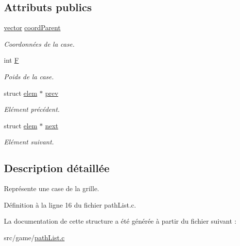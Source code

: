 \subsection*{Attributs publics}
\begin{DoxyCompactItemize}
\item 
\hypertarget{structelem_a5460522be783257def1ac511288d74cb}{}\hyperlink{structvector}{vector} \hyperlink{structelem_a5460522be783257def1ac511288d74cb}{coord\+Parent}\label{structelem_a5460522be783257def1ac511288d74cb}

\begin{DoxyCompactList}\small\item\em Coordonnées de la case. \end{DoxyCompactList}\item 
\hypertarget{structelem_a000b7b27f503652106d30642ce3f40c2}{}int \hyperlink{structelem_a000b7b27f503652106d30642ce3f40c2}{F}\label{structelem_a000b7b27f503652106d30642ce3f40c2}

\begin{DoxyCompactList}\small\item\em Poids de la case. \end{DoxyCompactList}\item 
\hypertarget{structelem_aed06f2c7ef2050b131c8b72e099a0090}{}struct \hyperlink{structelem}{elem} $\ast$ \hyperlink{structelem_aed06f2c7ef2050b131c8b72e099a0090}{prev}\label{structelem_aed06f2c7ef2050b131c8b72e099a0090}

\begin{DoxyCompactList}\small\item\em Elément précédent. \end{DoxyCompactList}\item 
\hypertarget{structelem_ab9cf5c2e1c9a0ec2938275b90d39d5ca}{}struct \hyperlink{structelem}{elem} $\ast$ \hyperlink{structelem_ab9cf5c2e1c9a0ec2938275b90d39d5ca}{next}\label{structelem_ab9cf5c2e1c9a0ec2938275b90d39d5ca}

\begin{DoxyCompactList}\small\item\em Elément suivant. \end{DoxyCompactList}\end{DoxyCompactItemize}


\subsection{Description détaillée}
Représente une case de la grille. 

Définition à la ligne 16 du fichier path\+List.\+c.



La documentation de cette structure a été générée à partir du fichier suivant \+:\begin{DoxyCompactItemize}
\item 
src/game/\hyperlink{pathList_8c}{path\+List.\+c}\end{DoxyCompactItemize}
